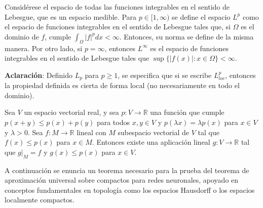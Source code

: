 \begin{definicion}[Espacios $L_p$]
Considérese el espacio de todas las funciones integrables en el sentido de Lebesgue, que es un espacio medible. Para $p\in[1,\infty)$ se define el espacio $L^p$ como el espacio de funciones integrables en el sentido de Lebesgue tales que, si $\Omega$ es el dominio de $f$, cumple $\int_{\Omega} |f|^p dx < \infty$. Entonces, su norma se define de la misma manera. Por otro lado, si $p=\infty$, entonces $L^{\infty}$ es el espacio de funciones integrables en el sentido de Lebesgue tales que $\sup\{|f(x)|:x\in\Omega\}<\infty$.
\end{definicion}

\textbf{Aclaración}: Definido $L_p$ para $p\geq 1$, se especifica que si se escribe $L_{loc}^{p}$, entonces la propiedad definida es cierta de forma local (no necesariamente en todo el dominio).



\begin{teorema}
Sea $V$ un espacio vectorial real, y sea $p: V \to \mathbb{R}$ una función que cumple $p(x+y)\leq p(x)+p(y)$ para todos $x, y \in V$ y $p(\lambda x)=\lambda p(x)$ para $x \in V$ y $\lambda > 0$. Sea $f: M \to \mathbb{R}$ lineal con $M$ subespacio vectorial de $V$ tal que $f(x) \leq p(x)$ para $x \in M$. Entonces existe una aplicación lineal $g: V \to \mathbb{R}$ tal que $g|_{M} = f$ y $g(x) \leq p(x)$ para $x \in V$.
\end{teorema}


A continuación se enuncia un teorema necesario para la prueba del teorema de aproximación universal sobre compactos para redes neuronales, apoyado en conceptos fundamentales en topología como los espacios Hausdorff o los espacios localmente compactos.

